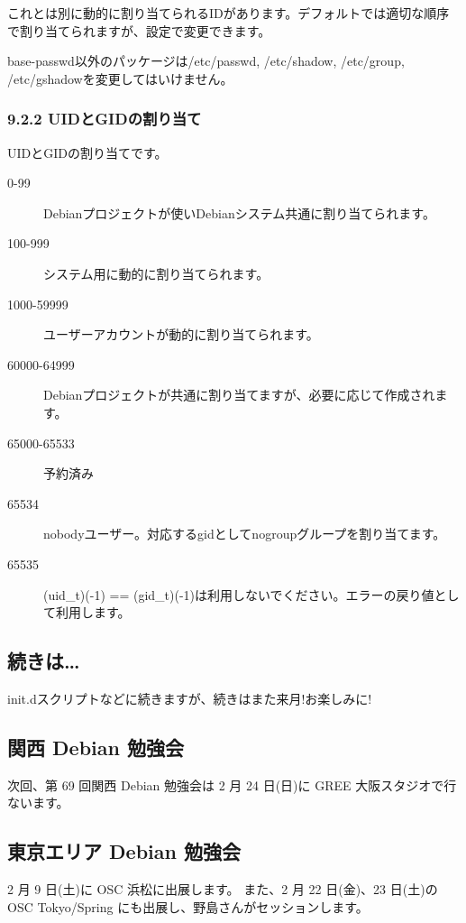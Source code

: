 \documentclass[mingoth,a4paper]{jsarticle}
\begin{document}
これとは別に動的に割り当てられるIDがあります。デフォルトでは適切な順序
で割り当てられますが、設定で変更できます。

base-passwd以外のパッケージは/etc/passwd, /etc/shadow, /etc/group,
/etc/gshadowを変更してはいけません。

\subsubsection{9.2.2 UIDとGIDの割り当て}

UIDとGIDの割り当てです。

\begin{description}
\item[0-99]
Debianプロジェクトが使いDebianシステム共通に割り当てられます。
\item[100-999]
システム用に動的に割り当てられます。
\item[1000-59999]
ユーザーアカウントが動的に割り当てられます。
\item[60000-64999]
Debianプロジェクトが共通に割り当てますが、必要に応じて作成されます。
\item[65000-65533]
予約済み
\item[65534]
nobodyユーザー。対応するgidとしてnogroupグループを割り当てます。
\item[65535]
(uid\_t)(-1) ==
(gid\_t)(-1)は利用しないでください。エラーの戻り値として利用します。
\end{description}

\subsection{続きは\ldots{}}

init.dスクリプトなどに続きますが、続きはまた来月!お楽しみに!

\clearpage


\subsection{関西 Debian 勉強会}

次回、第 69 回関西 Debian 勉強会は 2 月 24 日(日)に GREE 大阪スタジオで行ないます。

\subsection{東京エリア Debian 勉強会}
2 月 9 日(土)に OSC 浜松に出展します。
また、2 月 22 日(金)、23 日(土)の OSC Tokyo/Spring にも出展し、野島さんがセッションします。
\end{document}
